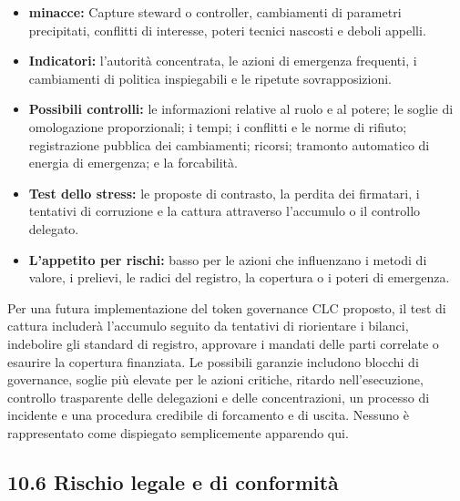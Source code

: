 \documentclass[11pt]{article}
\begin{document}
\begin{itemize}[leftmargin=*]
\item \textbf{minacce:} Capture steward o controller, cambiamenti di parametri precipitati, conflitti di interesse, poteri tecnici nascosti e deboli appelli.
\item \textbf{Indicatori:} l'autorità concentrata, le azioni di emergenza frequenti, i cambiamenti di politica inspiegabili e le ripetute sovrapposizioni.
\item \textbf{Possibili controlli:} le informazioni relative al ruolo e al potere; le soglie di omologazione proporzionali; i tempi; i conflitti e le norme di rifiuto; registrazione pubblica dei cambiamenti; ricorsi; tramonto automatico di energia di emergenza; e la forcabilità.
\item \textbf{Test dello stress:} le proposte di contrasto, la perdita dei firmatari, i tentativi di corruzione e la cattura attraverso l'accumulo o il controllo delegato.
\item \textbf{L'appetito per rischi:} basso per le azioni che influenzano i metodi di valore, i prelievi, le radici del registro, la copertura o i poteri di emergenza.
\end{itemize}
Per una futura implementazione del token governance CLC proposto, il test di cattura includerà l'accumulo seguito da tentativi di riorientare i bilanci, indebolire gli standard di registro, approvare i mandati delle parti correlate o esaurire la copertura finanziata. Le possibili garanzie includono blocchi di governance, soglie più elevate per le azioni critiche, ritardo nell'esecuzione, controllo trasparente delle delegazioni e delle concentrazioni, un processo di incidente e una procedura credibile di forcamento e di uscita. Nessuno è rappresentato come dispiegato semplicemente apparendo qui.

\subsection*{10.6 Rischio legale e di conformità}
\end{document}
